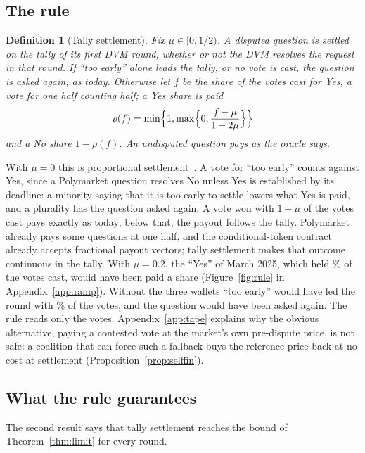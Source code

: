 \documentclass[conference,compsoc]{IEEEtran}
\newtheorem{definition}{Definition}
\newcommand{\muparam}{\mu}
\begin{document}
\subsection{The rule}
\begin{definition}[Tally settlement]
 Fix $\muparam \in [0, 1/2)$. A disputed question is settled on the tally of its first DVM round, whether or not the DVM resolves the request in that round. If ``too early'' alone leads the tally, or no vote is cast, the question is asked again, as today. Otherwise let $f$ be the share of the votes cast for Yes, a vote for one half counting half; a Yes share is paid
\[
\rho(f) = \min\Bigl\{1, \max\Bigl\{0, \frac{f - \muparam}{1 - 2\muparam}\Bigr\}\Bigr\}
\]
and a No share $1 - \rho(f)$. An undisputed question pays as the oracle says.
\end{definition}
 With $\muparam = 0$ this is proportional settlement~\cite{freeman2017}. A vote for ``too early'' counts against Yes, since a Polymarket question resolves No unless Yes is established by its deadline: a minority saying that it is too early to settle lowers what Yes is paid, and a plurality has the question asked again. A vote won with $1-\muparam$ of the votes cast pays exactly as today; below that, the payout follows the tally. Polymarket already pays some questions at one half, and the conditional-token contract already accepts fractional payout vectors; tally settlement makes that outcome continuous in the tally. With $\muparam = 0.2$, the ``Yes'' of March 2025, which held \rampMarchVotesPct\% of the votes cast, would have been paid \rampMarchWithTwenty{} a share (Figure~\ref{fig:rule} in Appendix~\ref{app:ramp}). Without the three wallets ``too early'' would have led the round with \marchTooEarlyWithoutPct\% of the votes, and the question would have been asked again. The rule reads only the votes. Appendix~\ref{app:tape} explains why the obvious alternative, paying a contested vote at the market's own pre-dispute price, is not safe: a coalition that can force such a fallback buys the reference price back at no cost at settlement (Proposition~\ref{prop:selffin}).

\subsection{What the rule guarantees}
\label{sec:guarantee}
The second result says that tally settlement reaches the bound of Theorem~\ref{thm:limit} for every round.
\end{document}
